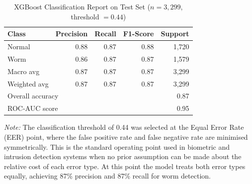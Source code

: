 \begin{table}[ht]
\centering
\caption{XGBoost Classification Report on Test Set ($n = 3{,}299$, threshold $= 0.44$)}
\label{tab:classification_report}
\begin{tabular}{lrrrr}
\toprule
\textbf{Class} & \textbf{Precision} & \textbf{Recall} & \textbf{F1-Score} & \textbf{Support} \\
\midrule
Normal          & 0.88 & 0.87 & 0.88 & 1{,}720 \\
Worm            & 0.86 & 0.87 & 0.87 & 1{,}579 \\
\midrule
Macro avg       & 0.87 & 0.87 & 0.87 & 3{,}299 \\
Weighted avg    & 0.87 & 0.87 & 0.87 & 3{,}299 \\
\midrule
\multicolumn{4}{l}{Overall accuracy} & 0.87 \\
\multicolumn{4}{l}{ROC-AUC score}    & 0.95 \\
\bottomrule
\end{tabular}
\begin{minipage}{\linewidth}
\vspace{4pt}
\small
\textit{Note:} The classification threshold of 0.44 was selected at the
Equal Error Rate (EER) point, where the false positive rate and false negative rate
are minimised symmetrically. This is the standard operating point used in biometric
and intrusion detection systems when no prior assumption can be made about the
relative cost of each error type. At this point the model treats both error types
equally, achieving 87\% precision and 87\% recall for worm detection.
\end{minipage}
\end{table}


